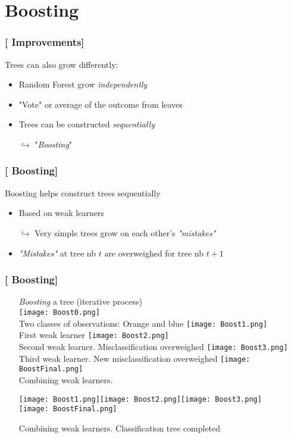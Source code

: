\documentclass[xcolor=x11names,compress]{beamer}
\renewcommand{\(}{\begin{columns}}
\renewcommand{\)}{\end{columns}}
\newcommand{\<}[1]{\begin{column}{#1}}
\renewcommand{\>}{\end{column}}
\begin{document}
\section{Boosting}

\begin{frame}
\frametitle{\textcolor{brique}{[ Improvements]}}
Trees can also grow differently:
\pause
 \begin{itemize}[<+->]
    \item Random Forest grow \textit{independently}
    \item "Vote" or average of the outcome from leaves
    \item Trees can be constructed \textit{sequentially}
    \item[$\hookrightarrow$] "\emph{Boosting}"
 \end{itemize}
\end{frame}

\begin{frame}
\frametitle{\textcolor{brique}{[ Boosting]}}
Boosting helps construct trees sequentially
\pause
 \begin{itemize}[<+->]
    \item Based on weak learners
    \item[$\hookrightarrow$] Very simple trees grow on each other's \textit{"mistakes"}
    \item \textit{"Mistakes"} at tree nb $t$  are overweighed for tree nb $t+1$
 \end{itemize}
\end{frame}


\begin{frame}
\frametitle{\textcolor{brique}{[ Boosting]}}
\pause
\begin{itemize}
\item[] \textit{Boosting} a tree (iterative process)\\
    {\texttt{[image: Boost0.png]} \\ }
    {Two classes of observations: Orange and blue}
    {\texttt{[image: Boost1.png]} \\ }
    {First weak learner}
    {\texttt{[image: Boost2.png]} \\ }
    {Second weak learner. Misclassification overweighed}
    {\texttt{[image: Boost3.png]} \\ }
    {Third weak learner. New misclassification overweighed}
    {\texttt{[image: BoostFinal.png]} \\ }
    {Combining weak learners.}
    { \begin{center} \texttt{[image: Boost1.png]}\texttt{[image: Boost2.png]}\texttt{[image: Boost3.png]} \\
           \texttt{[image: BoostFinal.png]} \end{center}  }
    {Combining weak learners. Classification  tree completed}
\end{itemize}
\end{frame}
\end{document}
